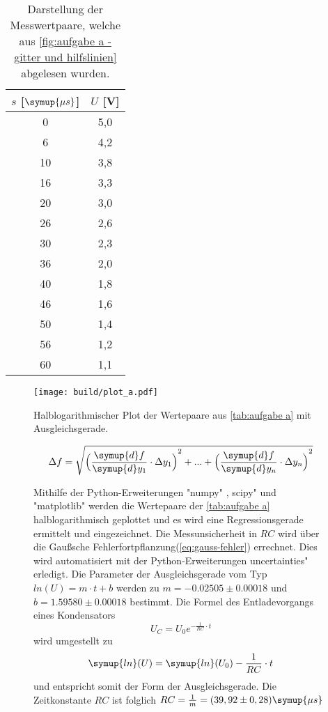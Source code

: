 \begin{table}
  \centering
  \caption{Darstellung der Messwertpaare, welche aus \autoref{fig:aufgabe a - gitter und hilfslinien} abgelesen wurden.}
  \label{tab:aufgabe a}
  \begin{tabular}{S[table-format=2.0] S[table-format=1.1]}
    \toprule
    {$s$ [$\symup{\mu s}$]} & {$U$ [V]} \\
     &  5,0 \\
    6	&  4,2 \\
    10 & 3,8 \\
    16 & 3,3 \\
    20 & 3,0 \\
    26 & 2,6 \\
    30 & 2,3 \\
    36 & 2,0 \\
    40 & 1,8 \\
    46 & 1,6 \\
    50 & 1,4 \\
    56 & 1,2 \\
    60 & 1,1 \\
    \bottomrule
  \end{tabular}
\end{table}

\begin{figure}
  \centering
  \texttt{[image: build/plot\_a.pdf]}
  \caption{Halblogarithmischer Plot der Wertepaare aus \autoref{tab:aufgabe a} %
  mit Ausgleichsgerade.}
  \label{fig:plot_a}
\end{figure}

\begin{equation}
  \Delta f = \sqrt{{\Bigl(\frac{\symup{d}f}{\symup{d}y_{1}} \cdot \Delta y_{1}\Bigr)}^{2} + ...%
   + {\Bigl(\frac{\symup{d}f}{\symup{d}y_{n}} \cdot \Delta y_{n}\Bigr)}^{2} }
  \label{eq:gauss-fehler}
\end{equation}

\begin{figure}[!h]
  Mithilfe der Python-Erweiterungen "numpy" \cite{numpy}, \dq scipy" \cite{scipy} und "matplotlib" \cite{matplotlib} werden die Wertepaare der 
\autoref{tab:aufgabe a} halblogarithmisch geplottet und es wird eine Regressionsgerade ermittelt und eingezeichnet. Die Messunsicherheit in $RC$
wird über die Gaußsche Fehlerfortpflanzung(\autoref{eq:gauss-fehler}) errechnet. Dies wird automatisiert mit der Python-Erweiterungen
\dq uncertainties"\cite{uncertainties} erledigt. Die Parameter der
Ausgleichsgerade vom Typ $ln(U) = m \cdot t + b$ werden zu $m=-0.02505\pm0.00018$ und $b=1.59580\pm0.00018$ bestimmt.
  Die Formel des Entladevorgangs eines Kondensators
  \begin{equation}
    U_{C} = U_{0}e^{-\frac{1}{RC}\cdot t}
  \end{equation}
  wird umgestellt zu
  \begin{equation}
    \symup{ln}(U) = \symup{ln}(U_{0})-\frac{1}{RC}\cdot t
  \end{equation}
  und entspricht somit der Form der Ausgleichsgerade. Die Zeitkonstante $RC$ ist folglich 
  $RC = \frac{1}{m} = (39,92\pm0,28) \symup{\mu s}$
\end{figure}

